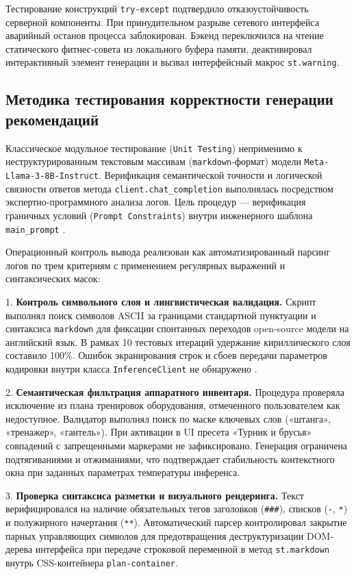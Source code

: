 \documentclass[14pt, a4paper]{extarticle}
\begin{document}
Тестирование конструкций \texttt{try-except} подтвердило отказоустойчивость серверной компоненты. При принудительном разрыве сетевого интерфейса аварийный останов процесса заблокирован. Бэкенд переключился на чтение статического фитнес-совета из локального буфера памяти, деактивировал интерактивный элемент генерации и вызвал интерфейсный макрос \texttt{st.warning}.

\subsection{Методика тестирования корректности генерации рекомендаций}

Классическое модульное тестирование (\texttt{Unit Testing}) неприменимо к неструктурированным текстовым массивам (\texttt{markdown}-формат) модели \texttt{Meta-Llama-3-8B-Instruct}. Верификация семантической точности и логической связности ответов метода \texttt{client.chat\_completion} выполнялась посредством экспертно-программного анализа логов. Цель процедур --- верификация граничных условий (\texttt{Prompt Constraints}) внутри инженерного шаблона \texttt{main\_prompt} \cite{app.py}.

Операционный контроль вывода реализован как автоматизированный парсинг логов по трем критериям с применением регулярных выражений и синтаксических масок:

1. \textbf{Контроль символьного слоя и лингвистическая валидация.} Скрипт выполнял поиск символов ASCII за границами стандартной пунктуации и синтаксиса \texttt{markdown} для фиксации спонтанных переходов open-source модели на английский язык. В рамках 10 тестовых итераций удержание кириллического слоя составило 100\%. Ошибок экранирования строк и сбоев передачи параметров кодировки внутри класса \texttt{InferenceClient} не обнаружено \cite{app.py}.

2. \textbf{Семантическая фильтрация аппаратного инвентаря.} Процедура проверяла исключение из плана тренировок оборудования, отмеченного пользователем как недоступное. Валидатор выполнял поиск по маске ключевых слов («штанга», «тренажер», «гантель»). При активации в UI пресета «Турник и брусья» совпадений с запрещенными маркерами не зафиксировано. Генерация ограничена подтягиваниями и отжиманиями, что подтверждает стабильность контекстного окна при заданных параметрах температуры инференса.

3. \textbf{Проверка синтаксиса разметки и визуального рендеринга.} Текст верифицировался на наличие обязательных тегов заголовков (\texttt{\#\#\#}), списков (\texttt{-}, \texttt{*}) и полужирного начертания (\texttt{**}). Автоматический парсер контролировал закрытие парных управляющих символов для предотвращения деструктуризации DOM-дерева интерфейса при передаче строковой переменной в метод \texttt{st.markdown} внутрь CSS-контейнера \texttt{plan-container}.
\end{document}
